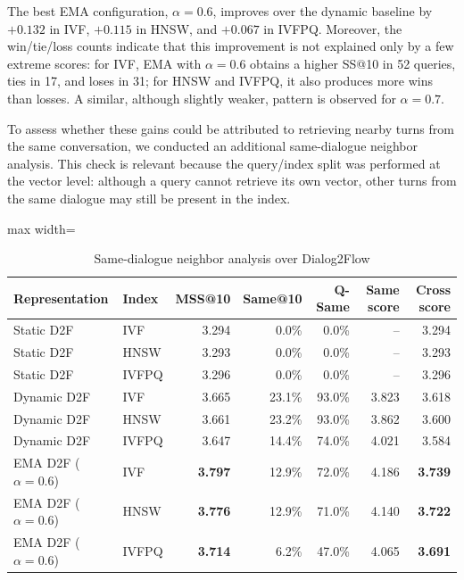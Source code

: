 \documentclass[runningheads]{llncs}
\begin{document}
The best EMA configuration, $\alpha=0.6$, improves over the dynamic baseline by $+0.132$ in IVF, $+0.115$ in HNSW, and $+0.067$ in IVFPQ. Moreover, the win/tie/loss counts indicate that this improvement is not explained only by a few extreme scores: for IVF, EMA with $\alpha=0.6$ obtains a higher SS@10 in 52 queries, ties in 17, and loses in 31; for HNSW and IVFPQ, it also produces more wins than losses. A similar, although slightly weaker, pattern is observed for $\alpha=0.7$.

To assess whether these gains could be attributed to retrieving nearby turns from the same conversation, we conducted an additional same-dialogue neighbor analysis. This check is relevant because the query/index split was performed at the vector level: although a query cannot retrieve its own vector, other turns from the same dialogue may still be present in the index. 

\begin{table}[ht]
\centering
\scriptsize
\setlength{\tabcolsep}{4pt}
\renewcommand{\arraystretch}{1.12}
\caption{Same-dialogue neighbor analysis over Dialog2Flow}
\label{tab:same_dialogue_analysis}
\begin{adjustbox}{max width=\textwidth}
\begin{tabular}{llrrrrr}
\toprule
\textbf{Representation} & \textbf{Index} & \textbf{MSS@10} & \textbf{Same@10} & \textbf{Q-Same} & \textbf{Same score} & \textbf{Cross score} \\
\midrule
Static D2F & IVF   & 3.294 & 0.0\%  & 0.0\%  & --    & 3.294 \\
Static D2F & HNSW  & 3.293 & 0.0\%  & 0.0\%  & --    & 3.293 \\
Static D2F & IVFPQ & 3.296 & 0.0\%  & 0.0\%  & --    & 3.296 \\
\midrule
Dynamic D2F & IVF   & 3.665 & 23.1\% & 93.0\% & 3.823 & 3.618 \\
Dynamic D2F & HNSW  & 3.661 & 23.2\% & 93.0\% & 3.862 & 3.600 \\
Dynamic D2F & IVFPQ & 3.647 & 14.4\% & 74.0\% & 4.021 & 3.584 \\
\midrule
EMA D2F ($\alpha=0.6$) & IVF   & \textbf{3.797} & 12.9\% & 72.0\% & 4.186 & \textbf{3.739} \\
EMA D2F ($\alpha=0.6$) & HNSW  & \textbf{3.776} & 12.9\% & 71.0\% & 4.140 & \textbf{3.722} \\
EMA D2F ($\alpha=0.6$) & IVFPQ & \textbf{3.714} & 6.2\%  & 47.0\% & 4.065 & \textbf{3.691} \\
\bottomrule
\end{tabular}
\end{adjustbox}
\end{table}
\end{document}
